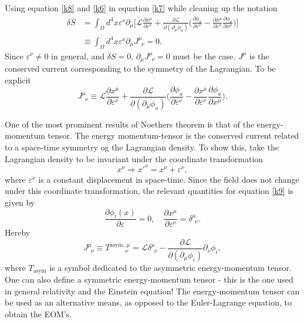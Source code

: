 Using equation \eqref{k8} and \eqref{k6} in equation \eqref{k7} while cleaning up the notation
\begin{equation}
	\begin{split}
		\delta S&=\int_{\Omega}d^4x \varepsilon^\nu\partial_\mu\bigg[\mathcal{L}\frac{\partial x^\mu}{\partial \varepsilon^\nu}+\frac{\partial \mathcal{L}}{\partial (\partial_\mu \phi_a)}\bigg(\frac{\partial \phi_a}{\partial \varepsilon^\nu}-\frac{\partial x^\mu}{\partial \varepsilon^\nu} \frac{\partial \phi_a}{\partial x^\mu}\bigg)\bigg]\\
		&\equiv\int_{\Omega}d^4x \varepsilon^\nu\partial_\mu J^\mu_{\,\,\,\nu}=0.
	\end{split}
	\label{k9}
\end{equation} 
Since $\varepsilon^\nu \neq 0$ in general, and $\delta S=0$, $\partial_\mu J^\mu_{\,\,\,\nu}=0$ must be the case. $J^\mu$ is the conserved current corresponding to the symmetry of the Lagrangian. To be explicit
\begin{equation}
	J^\mu_{\,\,\,\nu}\equiv\mathcal{L}\frac{\partial x^\mu}{\partial \varepsilon^\nu}+\frac{\partial \mathcal{L}}{\partial (\partial_\mu \phi_a)}\bigg(\frac{\partial \phi_a}{\partial \varepsilon^\nu}-\frac{\partial x^\mu}{\partial \varepsilon^\nu} \frac{\partial \phi_a}{\partial x^\mu}\bigg).
\end{equation} 

\begin{example}
	One of the most prominent results of Noethers theorem is that of the energy-momentum tensor. The energy momentum-tensor is the conserved current related to a space-time symmetry og the Lagrangian density. To show this, take the Lagrangian density to be invariant under the coordinate transformation
	\begin{equation}
		x^\nu\Rightarrow {x'}^\nu=x^\nu+\varepsilon^\nu,
	\end{equation} 
	where $\varepsilon^\nu$ is a constant displacement in space-time. Since the field does not change under this coordinate transformation, the relevant quantities for equation \eqref{k9} is given by
	\begin{equation}
		\frac{\partial \phi_i(x)}{\partial \varepsilon}=0, \quad \frac{\partial x^\mu}{\partial \varepsilon^\nu}=\delta^\mu_{\,\,\, \nu}.
	\end{equation} 
	Hereby
	\begin{equation}
		J^\mu_{\,\,\,\nu}\equiv T^{\text{asym}, \, \mu}_{\,\,\,\,\,\,\,\,\,\,\,\,\,\,\,\,\nu}=\mathcal{L}\delta^\mu_{\,\,\,\nu}-\frac{\partial \mathcal{L}}{\partial (\partial_\mu\phi_i)}\partial_\nu\phi_i,
		\label{EM tensor}
	\end{equation} 
	where $T_{\text{asym}}$ is a symbol dedicated to the asymmetric energy-momentum tensor. One can also define a symmetric energy-momentum tensor - this is the one used in general relativity and the Einstein equation! The energy-momentum tensor can be used as an alternative means, as opposed to the Euler-Lagrange equation, to obtain the EOM's.
	
\end{example}

